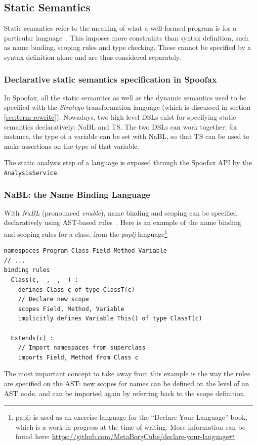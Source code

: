 \subsection{Static Semantics}
\label{sec:static-analysis}
Static semantics refer to the meaning of what a well-formed program is
for a particular language~\cite{Milner97}. This imposes more
constraints than syntax definition, such as name binding, scoping
rules and type checking. These cannot be specified by a syntax
definition alone and are thus considered separately.
\subsubsection{Declarative static semantics specification in Spoofax}
\label{sec:orgheadline3}
In Spoofax, all the static semantics as well as the dynamic semantics
used to be specified with the \emph{Stratego} transformation language
(which is discussed in section \ref{sec:term-rewrite}). Nowadays, two
high-level DSLs exist for specifying static semantics declaratively:
NaBL and TS. The two DSLs can work together: for instance, the type of
a variable can be set with NaBL, so that TS can be used to make
assertions on the type of that variable.

The static analysis step of a language is exposed through the Spoofax
API by the \texttt{AnalysisService}.
\subsubsection{NaBL: the Name Binding Language}
\label{sec:nabl}
With \emph{NaBL} (pronounced \emph{enable}), name binding and scoping can be
specified declaratively using AST-based
rules~\cite{KonatKWV12}. Here is an example of the name binding
and scoping rules for a class, from the \emph{paplj}
language\footnote{paplj is used as an exercise language for the
``Declare Your Language'' book, which is a work-in-progress at the time
of writing. More information can be found here:
\url{https://github.com/MetaBorgCube/declare-your-language}}
\lstset{language=nabl,numbers=left}
\begin{lstlisting}
namespaces Program Class Field Method Variable
// ...
binding rules
  Class(c, _, _, _) :
    defines Class c of type ClassT(c)
    // Declare new scope
    scopes Field, Method, Variable
    implicitly defines Variable This() of type ClassT(c)

  Extends(c) :
    // Import namespaces from superclass
    imports Field, Method from Class c
\end{lstlisting}
The most important concept to take away from this example is the way
the rules are specified on the AST: new scopes for names can be
defined on the level of an AST node, and can be imported again by
referring back to the scope definition.

